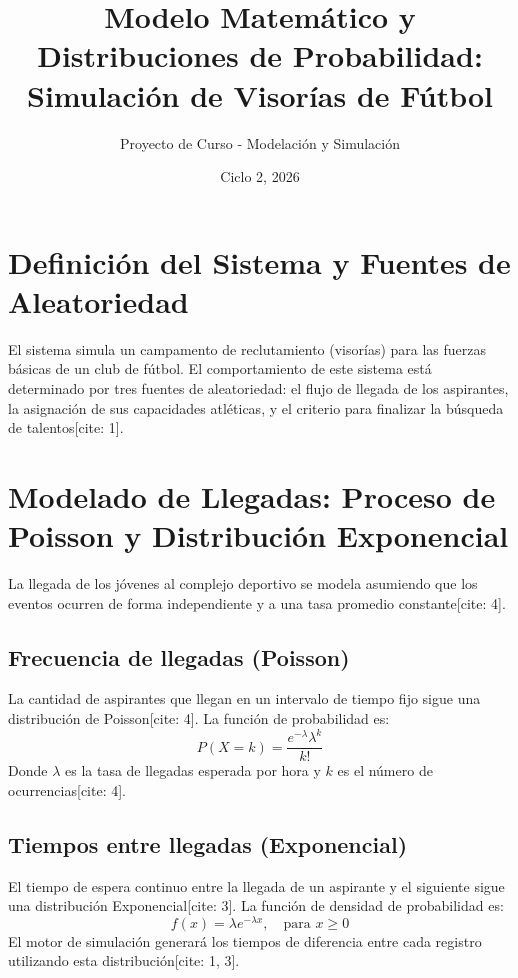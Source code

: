 \documentclass[12pt,a4paper]{article}
\title{Modelo Matemático y Distribuciones de Probabilidad: Simulación de Visorías de Fútbol}
\author{Proyecto de Curso - Modelación y Simulación}
\date{Ciclo 2, 2026}
\begin{document}
\maketitle

\section{Definición del Sistema y Fuentes de Aleatoriedad}
El sistema simula un campamento de reclutamiento (visorías) para las fuerzas básicas de un club de fútbol. El comportamiento de este sistema está determinado por tres fuentes de aleatoriedad: el flujo de llegada de los aspirantes, la asignación de sus capacidades atléticas, y el criterio para finalizar la búsqueda de talentos[cite: 1].

\section{Modelado de Llegadas: Proceso de Poisson y Distribución Exponencial}
La llegada de los jóvenes al complejo deportivo se modela asumiendo que los eventos ocurren de forma independiente y a una tasa promedio constante[cite: 4].

\subsection{Frecuencia de llegadas (Poisson)}
La cantidad de aspirantes que llegan en un intervalo de tiempo fijo sigue una distribución de Poisson[cite: 4]. La función de probabilidad es:
\begin{equation}
    P(X=k) = \frac{e^{-\lambda}\lambda^{k}}{k!}
\end{equation}
Donde $\lambda$ es la tasa de llegadas esperada por hora y $k$ es el número de ocurrencias[cite: 4].

\subsection{Tiempos entre llegadas (Exponencial)}
El tiempo de espera continuo entre la llegada de un aspirante y el siguiente sigue una distribución Exponencial[cite: 3]. La función de densidad de probabilidad es:
\begin{equation}
    f(x) = \lambda e^{-\lambda x}, \quad \text{para } x \ge 0
\end{equation}
El motor de simulación generará los tiempos de diferencia entre cada registro utilizando esta distribución[cite: 1, 3].
\end{document}
